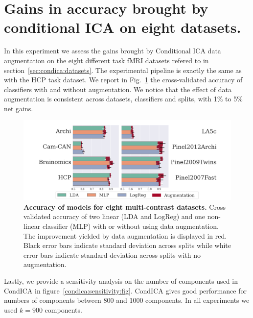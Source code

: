 \section{Gains in accuracy brought by conditional ICA on eight datasets.}
In this experiment we assess the gains brought by Conditional ICA data
augmentation on the eight different task fMRI datasets refered to in section~\ref{sec:condica:datasets}. The experimental pipeline is exactly the same as with the HCP task dataset.
We report in Fig.~\ref{Fig4} the cross-validated accuracy of
classifiers with and without augmentation.
We notice that the effect of data augmentation is
consistent across datasets, classifiers and splits, with 1\% to 5\% net gains.
%
\begin{figure}
  \centering
  \includegraphics[width=\textwidth]{figures/condica/accuracy_all_datasets_v5.png}
\caption{\textbf{Accuracy of models for eight multi-contrast datasets.} Cross
  validated accuracy of two linear (LDA and LogReg) and one non-linear
  classifier (MLP) with or without using data augmentation.
  The improvement yielded by data augmentation is displayed in red.
  Black error bars indicate standard deviation across splits while white error bars indicate standard deviation across splits with no augmentation.}
\label{Fig4}
\end{figure}
%

Lastly, we provide a sensitivity analysis on the number of components used in
CondICA in figure~\ref{condica:sensitivity:fig}.
CondICA gives good performance for numbers of components between 800 and 1000
components. In all experiments we used $k=900$ components.


